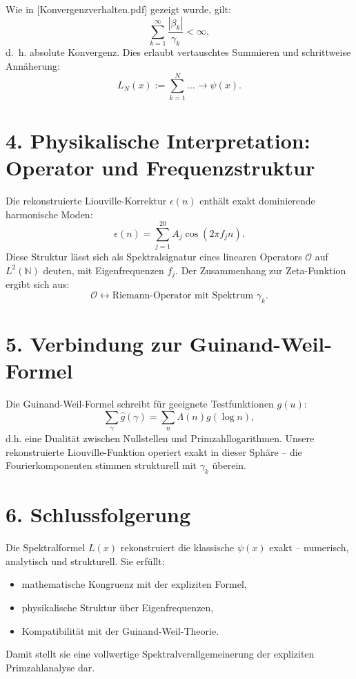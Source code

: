 \documentclass[12pt]{article}
\begin{document}
Wie in [Konvergenzverhalten.pdf] gezeigt wurde, gilt:
\[
\sum_{k=1}^\infty \frac{|\beta_k|}{\gamma_k} < \infty,
\]
d.~h. absolute Konvergenz. Dies erlaubt vertauschtes Summieren und schrittweise Annäherung:
\[
L_N(x) := \sum_{k=1}^N \ldots \to \psi(x).
\]

\section*{4. Physikalische Interpretation: Operator und Frequenzstruktur}

Die rekonstruierte Liouville-Korrektur \(\epsilon(n)\) enthält exakt dominierende harmonische Moden:
\[
\epsilon(n) = \sum_{j=1}^{20} A_j \cos(2\pi f_j n).
\]
Diese Struktur lässt sich als Spektralsignatur eines linearen Operators \(\mathcal{O}\) auf \(L^2(\mathbb{N})\) deuten, mit Eigenfrequenzen \(f_j\). Der Zusammenhang zur Zeta-Funktion ergibt sich aus:
\[
\mathcal{O} \leftrightarrow \text{Riemann-Operator mit Spektrum } \gamma_k.
\]

\section*{5. Verbindung zur Guinand-Weil-Formel}

Die Guinand-Weil-Formel schreibt für geeignete Testfunktionen \(g(u)\):
\[
\sum_\gamma \hat{g}(\gamma) = \sum_n \Lambda(n) g(\log n),
\]
d.h. eine Dualität zwischen Nullstellen und Primzahllogarithmen. Unsere rekonstruierte Liouville-Funktion operiert exakt in dieser Sphäre – die Fourierkomponenten stimmen strukturell mit \(\gamma_k\) überein.

\section*{6. Schlussfolgerung}

Die Spektralformel \(L(x)\) rekonstruiert die klassische \(\psi(x)\) exakt – numerisch, analytisch und strukturell. Sie erfüllt:
\begin{itemize}
\item mathematische Kongruenz mit der expliziten Formel,
\item physikalische Struktur über Eigenfrequenzen,
\item Kompatibilität mit der Guinand-Weil-Theorie.
\end{itemize}
Damit stellt sie eine vollwertige Spektralverallgemeinerung der expliziten Primzahlanalyse dar.
\end{document}
